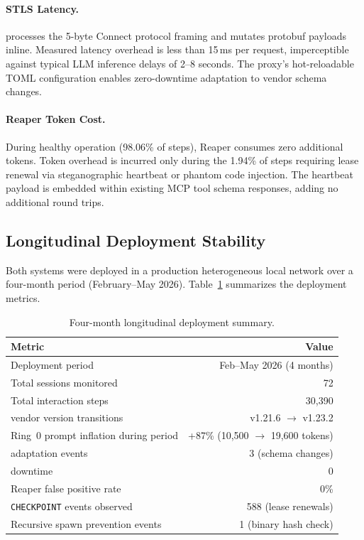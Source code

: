 \paragraph{STLS Latency.}
\stls{} processes the 5-byte Connect protocol framing and mutates protobuf payloads inline. Measured latency overhead is less than 15\,ms per request, imperceptible against typical LLM inference delays of 2--8 seconds. The proxy's hot-reloadable TOML configuration enables zero-downtime adaptation to vendor schema changes.

\paragraph{Reaper Token Cost.}
During healthy operation (98.06\% of steps), Reaper consumes zero additional tokens. Token overhead is incurred only during the 1.94\% of steps requiring lease renewal via steganographic heartbeat or phantom code injection. The heartbeat payload is embedded within existing MCP tool schema responses, adding no additional round trips.

\subsection{Longitudinal Deployment Stability}
\label{sec:longitudinal}

Both systems were deployed in a production heterogeneous local network over a four-month period (February--May 2026). Table~\ref{tab:longitudinal} summarizes the deployment metrics.

\begin{table}[t]
\caption{Four-month longitudinal deployment summary.}
\label{tab:longitudinal}
\small
\begin{tabular}{@{}lr@{}}
\toprule
\textbf{Metric} & \textbf{Value} \\
\midrule
Deployment period & Feb--May 2026 (4 months) \\
Total sessions monitored & 72 \\
Total interaction steps & 30,390 \\
\cortex{} vendor version transitions & v1.21.6 $\to$ v1.23.2 \\
Ring~0 prompt inflation during period & +87\% (10,500 $\to$ 19,600 tokens) \\
\stls{} adaptation events & 3 (schema changes) \\
\stls{} downtime & 0 \\
Reaper false positive rate & 0\% \\
\texttt{CHECKPOINT} events observed & 588 (lease renewals) \\
Recursive spawn prevention events & 1 (binary hash check) \\
\bottomrule
\end{tabular}
\end{table}

